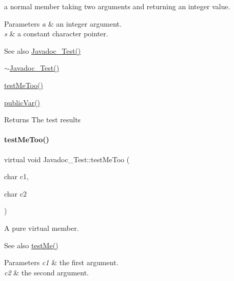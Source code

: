 a normal member taking two arguments and returning an integer value. 


\begin{DoxyParams}{Parameters}
{\em a} & an integer argument. \\
\hline
{\em s} & a constant character pointer. \\
\hline
\end{DoxyParams}
\begin{DoxySeeAlso}{See also}
\hyperlink{class_javadoc___test_a17313327932ae97596b0a455ba8342cc}{Javadoc\+\_\+\+Test()} 

\hyperlink{class_javadoc___test_a60016cd15a4ed82bbc35be79a0a6a6b5}{$\sim$\+Javadoc\+\_\+\+Test()} 

\hyperlink{class_javadoc___test_ac2b39cabbe80957ae3e8bc2bd4e887f6}{test\+Me\+Too()} 

\hyperlink{class_javadoc___test_a44a516fbc3a4865e2dcae34649c9df6a}{public\+Var()} 
\end{DoxySeeAlso}
\begin{DoxyReturn}{Returns}
The test results 
\end{DoxyReturn}
\mbox{\label{class_javadoc___test_ac2b39cabbe80957ae3e8bc2bd4e887f6}} 
\paragraph{\texorpdfstring{test\+Me\+Too()}{testMeToo()}}
{\footnotesize\ttfamily virtual void Javadoc\+\_\+\+Test\+::test\+Me\+Too (\begin{DoxyParamCaption}\item[{char}]{c1,  }\item[{char}]{c2 }\end{DoxyParamCaption})\hspace{0.3cm}{\ttfamily [pure virtual]}}



A pure virtual member. 

\begin{DoxySeeAlso}{See also}
\hyperlink{class_javadoc___test_a0c472683ed25ff096e8a9edfb18d550c}{test\+Me()} 
\end{DoxySeeAlso}

\begin{DoxyParams}{Parameters}
{\em c1} & the first argument. \\
\hline
{\em c2} & the second argument. \\
\hline
\end{DoxyParams}


